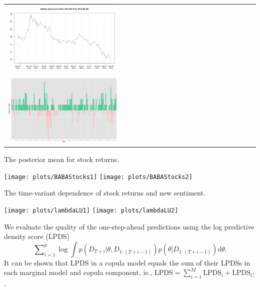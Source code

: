 \documentclass[a0paper,portrait,fontscale = 0.39,margin=2.5em]{baposter/baposter}
\begin{document}
\begin{poster}
{\begin{multicols}{2}
\begin{compactitem}
        \begin{tabular}{l}
          \includegraphics[width=0.45\textwidth]{plots/Alibaba-Stock-Price}\\
          \includegraphics[width=0.45\textwidth]{plots/Sen-Date}
        \end{tabular}


      \item The posterior mean for stock returns.

        \texttt{[image: plots/BABAStocks1]}
        \texttt{[image: plots/BABAStocks2]}




      \item The time-variant dependence of stock returns and new sentiment.


        \texttt{[image: plots/lambdaLU1]}
        \texttt{[image: plots/lambdaLU2]}






      \item We evaluate the quality of the one-step-ahead predictions using the log
        predictive density score (LPDS)
        {\color{blue} \footnotesize \[
          \sum\nolimits _{i=1}^{p}\log\int p(D_{T+i}|\theta,D_{1:(T+i-1)})p(\theta|D_{1:(T+i-1)})\mathrm{d}\theta.
        \]} It can be shown that LPDS in a copula model equals the sum of their LPDSs in
      each marginal model and copula component, ie.,
      {\color{blue} $\mathrm{LPDS}=\sum\nolimits _{i=1}^M \mathrm{LPDS}_i + \mathrm{LPDS}_C$}.

\end{compactitem}
\end{multicols}}
\end{poster}
\end{document}
